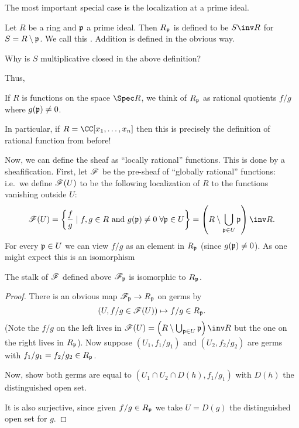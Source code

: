 \documentclass[11pt]{scrreprt}
\begin{document}
The most important special case is the localization at a prime ideal.
\begin{definition}
	Let $R$ be a ring and $\mathfrak p$ a prime ideal.
	Then $R_\mathfrak p$ is defined to be $S\inv R$ for $S = R\setminus\mathfrak p$.
	We call this .
	Addition is defined in the obvious way.
\end{definition}
\begin{ques}
	Why is $S$ multiplicative closed in the above definition?
\end{ques}
Thus,
\begin{moral}
	If $R$ is functions on the space $\Spec R$,
	we think of $R_\mathfrak p$ as rational quotients $f/g$ where $g(\mathfrak p) \neq 0$.
\end{moral}
In particular, if $R = \CC[x_1, \dots, x_n]$
then this is precisely the definition of rational function from before!

Now, we can define the sheaf as ``locally rational'' functions.
This is done by a sheafification.
First, let $\mathscr F$ be the pre-sheaf of ``globally rational'' functions:
i.e.\ we define $\mathscr F(U)$ to be the following localization of $R$
to the functions vanishing outside $U$:
\[
	\SF(U) = \left\{ 
		\frac fg \mid f, g \in R
		\text{ and } g(\pp) \neq 0 \; \forall \pp \in U
	\right\}
	= \left(R \setminus \bigcup_{\pp \in U} \pp \right)\inv R.
\]
For every $\mathfrak p \in U$ we can view $f/g$ as an element in $R_\mathfrak p$
(since $g(\mathfrak p) \ne 0$).
As one might expect this is an isomorphism
\begin{lemma}
	\label{lem:global_rational_stalk}
	The stalk of $\mathscr F$ defined above $\mathscr F_\mathfrak p$ is isomorphic to $R_\mathfrak p$.
\end{lemma}
\begin{proof}
	There is an obvious map $\mathscr F_\mathfrak p \to R_\mathfrak p$ on germs by
	\[
		\left(U, f/g \in \mathscr F(U) \right)
		\mapsto f/g \in R_\mathfrak p . \]
	(Note the $f/g$ on the left lives in
	$\SF(U) = \left(R \setminus \bigcup_{\pp \in U} \pp \right)\inv R$
	but the one on the right lives in $R_\mathfrak p$).
	Now suppose $(U_1, f_1 / g_1)$ and $(U_2, f_2 / g_2)$
	are germs with $f_1/g_1 = f_2/g_2 \in R_\mathfrak p$.
	\begin{exercise}
		Now, show both germs are equal to $(U_1 \cap U_2 \cap D(h), f_1 / g_1)$
		with $D(h)$ the distinguished open set.
	\end{exercise}
	It is also surjective, since given $f/g \in R_\mathfrak p$ we take $U = D(g)$
	the distinguished open set for $g$.
\end{proof}
\end{document}
